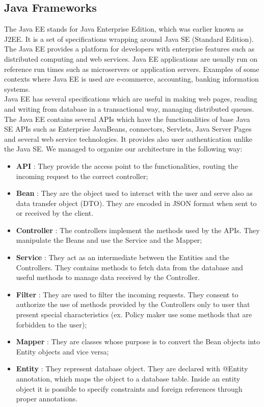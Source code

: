 \subsection{Java Frameworks}
\label{section:Java Framework}
The Java EE stands for Java Enterprise Edition, which was earlier known as J2EE. It is a set of specifications wrapping around Java SE (Standard Edition). The Java EE provides a platform for developers with enterprise features such as distributed computing and web services. Java EE applications are usually run on reference run times such as microservers or application servers. Examples of some contexts where Java EE is used are e-commerce, accounting, banking information systems.
\\ Java EE has several specifications which are useful in making web pages, reading and writing from database in a transactional way, managing distributed queues. The Java EE contains several APIs which have the functionalities of base Java SE APIs such as Enterprise JavaBeans, connectors, Servlets, Java Server Pages and several web service technologies. It provides also user authentication unlike the Java SE.
We managed to organize our architecture in the following way:

\begin{itemize}
    \item \textbf{API} : They provide the access point to the functionalities, routing the incoming request to the correct controller;
    \item \textbf{Bean} : They are the object used to interact with the user and serve also as data transfer object (DTO). They are encoded in JSON format when sent to or received by the client.
    \item \textbf{Controller} : The controllers implement the methods used by the APIs. They manipulate the Beans and use the Service and the Mapper;
    \item \textbf{Service} : They act as an intermediate between the Entities and the Controllers. They contains methods to fetch data from the database and useful methods to manage data received by the Controller.
    \item \textbf{Filter} : They are used to filter the incoming requests. They consent to authorize the use of methods provided by the Controllers only to user that present special characteristics (ex. Policy maker use some methods that are forbidden to the user);
    \item \textbf{Mapper} : They are classes whose purpose is to convert the Bean objects into Entity objects and vice versa;
    \item \textbf{Entity} : They represent database object. They are declared with @Entity annotation, which maps the object to a database table. Inside an entity object it is possible to specify constraints and foreign references through proper annotations.
\end{itemize}

